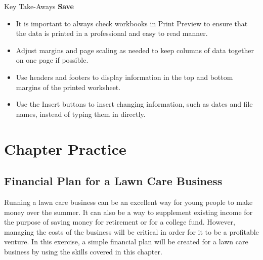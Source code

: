 \begin{center}
	\begin{tkwbox}{Key Take-Aways}
		\textbf{Save}
		\\
		\begin{itemize}
			\setlength{\itemsep}{0pt}
			\setlength{\parskip}{0pt}
			\setlength{\parsep}{0pt}
			
			\item It is important to always check workbooks in Print Preview to ensure that the data is printed in a professional and easy to read manner.
			\item Adjust margins and page scaling as needed to keep columns of data together on one page if possible.
			\item Use headers and footers to display information in the top and bottom margins of the printed worksheet.
			\item Use the Insert buttons to insert changing information, such as dates and file names, instead of typing them in directly.
			
		\end{itemize}
	\end{tkwbox}
\end{center}

\section{Chapter Practice}

\subsection{Financial Plan for a Lawn Care Business}

Running a lawn care business can be an excellent way for young people to make money over the summer. It can also be a way to supplement existing income for the purpose of saving money for retirement or for a college fund. However, managing the costs of the business will be critical in order for it to be a profitable venture. In this exercise, a simple financial plan will be created for a lawn care business by using the skills covered in this chapter.

